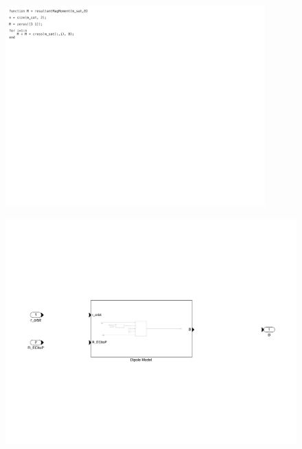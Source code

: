 \begin{figure}[H]
    \centering
    \includegraphics[trim={0cm 18cm 18cm 0cm},clip,width = 10cm]{Images/PS5/magneticField-2.png}
\end{figure}

\begin{figure}[H]
    \centering
    \includegraphics[trim={0.25cm 6cm 0.25cm 6cm},clip,width = 15cm]{Images/PS5/magneticField-3.png}
\end{figure}

